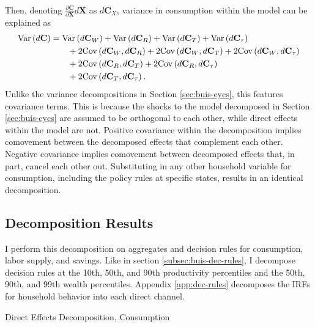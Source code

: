 Then, denoting $\frac{\partial \mathbf{C}}{\partial \mathbf{X}} d \mathbf{X}$ as $d \mathbf{C}_X$, variance in consumption within the model can be explained as
\begin{align*}
    \mathrm{Var}\left(d \mathbf{C}\right) &= \mathrm{Var}\left(d \mathbf{C}_W\right) + \mathrm{Var}\left(d \mathbf{C}_R\right) + \mathrm{Var}\left(d \mathbf{C}_T\right) + \mathrm{Var}\left(d \mathbf{C}_\tau\right) \\
    & \quad\quad + 2 \mathrm{Cov} \left(d \mathbf{C}_W, d \mathbf{C}_R\right) + 2 \mathrm{Cov} \left(d \mathbf{C}_W, d \mathbf{C}_T\right) + 2 \mathrm{Cov} \left(d \mathbf{C}_W, d \mathbf{C}_\tau\right) \\
    & \quad\quad + 2 \mathrm{Cov} \left(d \mathbf{C}_R, d \mathbf{C}_T\right) + 2 \mathrm{Cov} \left(d \mathbf{C}_R, d \mathbf{C}_\tau\right) \\
    & \quad\quad + 2 \mathrm{Cov} \left(d \mathbf{C}_T, d \mathbf{C}_\tau\right).
\end{align*}
Unlike the variance decompositions in Section \ref{sec:buis-cycs}, this features covariance terms. This is because the shocks to the model decomposed in Section \ref{sec:buis-cycs} are assumed to be orthogonal to each other, while direct effects within the model are not. Positive covariance within the decomposition implies comovement between the decomposed effects that complement each other. Negative covariance implies comovement between decomposed effects that, in part, cancel each other out. Substituting in any other household variable for consumption, including the policy rules at specific states, results in an identical decomposition. 


\subsection{Decomposition Results}

I perform this decomposition on aggregates and decision rules for consumption, labor supply, and savings. Like in section \ref{subsec:buis-dec-rules}, I decompose decision rules at the 10th, 50th, and 90th productivity percentiles and the 50th, 90th, and 99th wealth percentiles. Appendix \ref{app:dec-rules} decomposes the IRFs for household behavior into each direct channel.

\begin{table}[t]
    \centering
    \caption{Direct Effects Decomposition, Consumption}
    
    \label{tab:c-dir-decomp}
\end{table}

